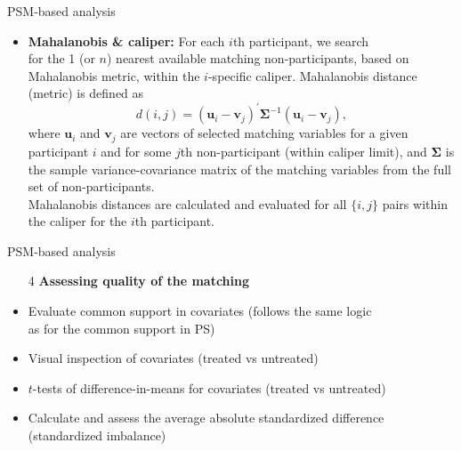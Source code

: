 \documentclass{beamer}
\begin{document}
\begin{frame}{PSM-based analysis}
\begin{itemize}
    \item \textbf{Mahalanobis \& caliper:} For each $i$th participant, we search \\for the 1 (or $n$) nearest available matching non-participants, based on Mahalanobis metric, within the $i$-specific caliper. Mahalanobis distance (metric) is defined as
    $$
    d(i,j) = (\bm{u}_i - \bm{v}_j)^{\prime} 
    \bm{\Sigma}^{-1} (\bm{u}_i - \bm{v}_j),
    $$
    where $\bm{u}_i$ and $\bm{v}_j$ are vectors of selected matching variables for a given participant $i$ and for some $j$th non-participant (within caliper limit), and $\bm{\Sigma}$ is the sample variance-covariance matrix of the matching variables from the full set of non-participants. \\ \medskip Mahalanobis distances are calculated and evaluated for all $\{i,j\}$ pairs within the caliper for the $i$th participant.
\end{itemize}
\end{frame}
\begin{frame}{PSM-based analysis}
\begin{enumerate}
    \item[4] \textbf{Assessing quality of the matching} \\ \smallskip
\end{enumerate}
\begin{itemize}
    \item Evaluate common support in covariates (follows the same logic \\as for the common support in PS)
    \smallskip
    \item Visual inspection of covariates (treated vs untreated)
    \smallskip
    \item $t$-tests of difference-in-means for covariates (treated vs untreated)
    \smallskip
    \item Calculate and assess the average absolute standardized difference (standardized imbalance)
\end{itemize}    
\end{frame}
\end{document}
